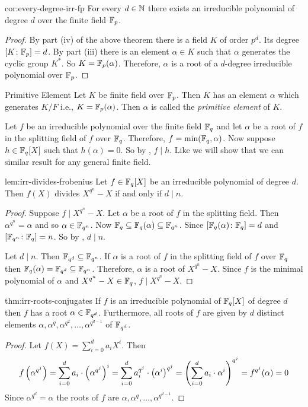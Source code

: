 \begin{corolary}{}{cor:every-degree-irr-fp}
  For every $d\in\mathbb{N}$ there exists an irreducible polynomial of degree $d$ over the finite field $\mathbb{F}_p$.
\end{corolary}
\begin{proof}
  By part (iv) of the above theorem there is a field $K$ of order $p^d$. Its degree $[K\colon \mathbb{F}_p]=d$. By part (iii) there is an element $\alpha\in K$ such that $\alpha$ generates the cyclic group $K^*$. So $K=\mathbb{F}_p(\alpha)$. Therefore, $\alpha$ is a root of a $d$-degree irreducible polynomial over $\mathbb{F}_p$. 
\end{proof}

\begin{Definition}{Primitive Element}{}
  Let $K$ be finite field over $\mathbb{F}_p$. Then $K$ has an element $\alpha$ which generates $K/F$ i.e., $K=\mathbb{F}_p(\alpha)$. Then $\alpha$ is called the \emph{primitive element} of $K$. 
\end{Definition}

Let $f$ be an irreducible polynomial over the finite field $\mathbb{F}_q$ and let $\alpha$ be a root of $f$ in the splitting field of $f$ over $\mathbb{F}_q$. 
Therefore, $f=\min(\mathbb{F}_q,\alpha)$. Now suppose $h\in\mathbb{F}_q[X]$ such that $h(\alpha)=0$. So by \SimpleExtthm, $f\mid h$. Like  we will show that we can similar result for any general finite field. 
\begin{lemma}{}{lem:irr-divides-frobenius}
  Let $f\in\mathbb{F}_q[X]$ be an irreducible polynomial of degree $d$.
  Then $f(X)$ divides $X^{q^n}-X$ if and only if $d\mid n$. 
\end{lemma}
\begin{proof}
  Suppose $f\mid X^{q^n}-X$. Let $\alpha$ be a root of $f$ in the splitting field. 
  Then $\alpha^{q^n}=\alpha$ and so $\alpha\in\mathbb{F}_{q^n}$. 
  Now $\mathbb{F}_q\subseteq \mathbb{F}_q(\alpha)\subseteq \mathbb{F}_{q^n}$. 
  Since $[\mathbb{F}_q(\alpha)\colon \mathbb{F}_q]=d$ and $[\mathbb{F}_{q^n}\colon \mathbb{F}_q]=n$. So by \TowerLawthm, $d\mid n$.

  Let $d\mid n$. Then $\mathbb{F}_{q^d}\subseteq \mathbb{F}_{q^n}$. If $\alpha$ is a root of $f$ in the splitting field of $f$ over $\mathbb{F}_q$ then $\mathbb{F}_q(\alpha)=\mathbb{F}_{q^d}\subseteq \mathbb{F}_{q^n}$. Therefore, $\alpha$ is a root of $X^{q^{n}}-X$. Since $f$ is the minimal polynomial of $\alpha$ and $X^{q^n}-X\in\mathbb{F}_q$, $f\mid X^{q^n}-X$. 
\end{proof}

\begin{Theorem}{}{thm:irr-roots-conjugates}
  If $f$ is an irreducible polynomial of $\mathbb{F}_q[X]$ of degree $d$ then $f$ has a root $\alpha\in\mathbb{F}_{q^d}$. Furthermore, all roots of $f$ are given by $d$ distinct elements $\alpha,\alpha^q,\alpha^{q^2},\dots, \alpha^{q^{d-1}}$ of $\mathbb{F}_{q^d}$.
\end{Theorem}
\begin{proof}
  Let $f(X)=\sum_{i=0}^da_iX^i$. 
  Then $$f\left(\alpha^{q^j}\right)=\sum_{i=0}^da_i\cdot \left(\alpha^{q^j}\right)^i=\sum_{i=0}^da_i^{q^j}\cdot \left(\alpha^i\right)^{q^j}=\left(\sum_{i=0}^d a_i\cdot \alpha^i\right)^{q^j}=f^{q^j}(\alpha)=0$$Since $\alpha^{q^{d}}=\alpha$ the roots of $f$ are $\alpha,\alpha^q,\dots, \alpha^{q^{d-1}}$. 
\end{proof}

